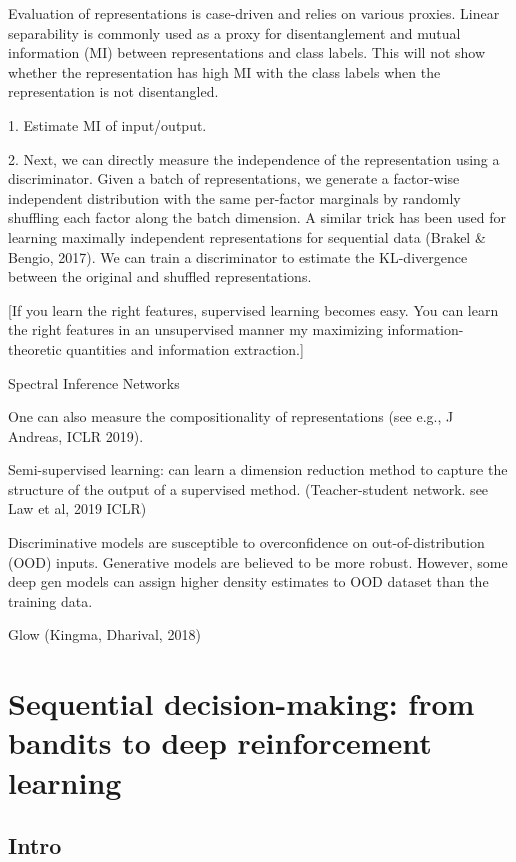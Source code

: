 \documentclass[english]{article}
\begin{document}
Evaluation of representations is case-driven and relies on various proxies. Linear separability is
commonly used as a proxy for disentanglement and mutual information (MI) between representations
and class labels.  This will not show whether the representation has high MI with
the class labels when the representation is not disentangled.


1. Estimate MI of input/output. 

2. Next, we can directly measure the independence of the representation using a discriminator. Given a
batch of representations, we generate a factor-wise independent distribution with the same per-factor
marginals by randomly shuffling each factor along the batch dimension. A similar trick has been used
for learning maximally independent representations for sequential data (Brakel \& Bengio, 2017). We
can train a discriminator to estimate the KL-divergence between the original and shuffled representations.


[If you learn the right features, supervised learning becomes easy. You can learn the right features in an unsupervised manner my maximizing information-theoretic quantities and information extraction.]

\item Spectral Inference Networks

One can also measure the compositionality of representations (see e.g., J Andreas, ICLR 2019).

\item Semi-supervised learning: can learn a dimension reduction method to capture the structure of the output of a supervised method. (Teacher-student network. see Law et al, 2019 ICLR)

\item Discriminative models are susceptible to overconfidence on out-of-distribution (OOD) inputs. Generative models are believed to be more robust. However, some deep gen models can assign higher density estimates to OOD dataset than the training data.

\item Glow (Kingma, Dharival, 2018)
\eenum



\section{Sequential decision-making: from bandits to deep reinforcement learning}

\subsection{Intro}
\end{document}
